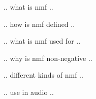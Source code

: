 

.. what is nmf ..

.. how is nmf defined ..

.. what is nmf used for ..

.. why is nmf non-negative ..

.. different kinds of nmf ..

.. use in audio ..
